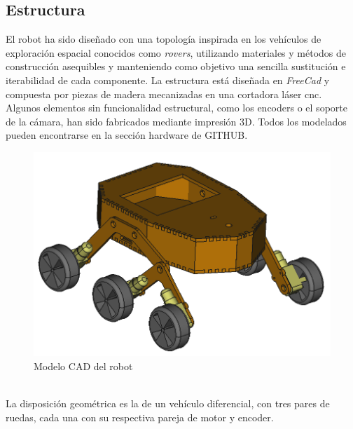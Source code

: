 \subsection{Estructura}
El robot ha sido diseñado con una topología inspirada en los vehículos de exploración espacial conocidos como \textit{rovers}, utilizando materiales y métodos de construcción asequibles y manteniendo como objetivo una sencilla sustitución e iterabilidad de cada componente. La estructura está diseñada en \textit{FreeCad} y compuesta por piezas de madera mecanizadas en una cortadora láser cnc.
Algunos elementos sin funcionalidad estructural, como los encoders o el soporte de la cámara, han sido fabricados mediante impresión 3D. Todos los modelados pueden encontrarse en la sección hardware de GITHUB.
\begin{figure}[h!]
	\centering
	\includegraphics[width=.6\textwidth]{images/hw/wheele_stl}
	\caption{Modelo CAD del robot}
\end{figure}
\\
La disposición geométrica es la de un vehículo diferencial, con tres pares de ruedas, cada una con su respectiva pareja de motor y encoder.\\

